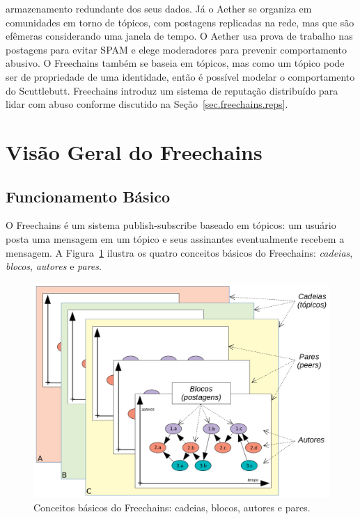 \documentclass[12pt]{article}
\newcommand{\FC} {Freechains\xspace}
\begin{document}
armazenamento redundante dos seus dados.
Já o Aether se organiza em comunidades em torno de tópicos, com postagens
replicadas na rede, mas que são efêmeras considerando uma janela de tempo.
O Aether usa prova de trabalho nas postagens para evitar SPAM e elege
moderadores para prevenir comportamento abusivo.
%
O \FC também se baseia em tópicos, mas como um tópico pode ser de propriedade
de uma identidade, então é possível modelar o comportamento do Scuttlebutt.
\FC introduz um sistema de reputação distribuído para lidar com abuso conforme
discutido na Seção~\ref{sec.freechains.reps}.

\section{Visão Geral do \FC}
\label{sec.freechains}

\subsection{Funcionamento Básico}

O \FC é um sistema publish-subscribe baseado em tópicos: um usuário
posta uma mensagem em um tópico e seus assinantes eventualmente recebem a
mensagem.
A Figura~\ref{fig.all} ilustra os quatro conceitos básicos do \FC:
\emph{cadeias}, \emph{blocos}, \emph{autores} e \emph{pares}.

\begin{figure}[ht]
\centering
\includegraphics[width=.60\textwidth]{all1.png}
\caption{\scriptsize{Conceitos básicos do \FC: cadeias, blocos, autores e pares.}}
\label{fig.all}
\end{figure}
\end{document}
